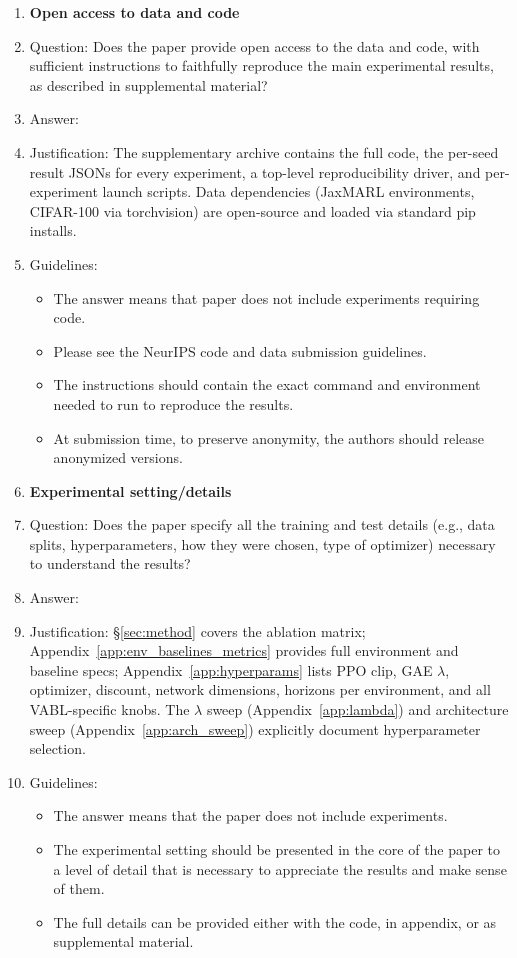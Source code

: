 \begin{enumerate}
\item {\bf Open access to data and code}
    \item[] Question: Does the paper provide open access to the data and code, with sufficient instructions to faithfully reproduce the main experimental results, as described in supplemental material?
    \item[] Answer: \answerYes{}
    \item[] Justification: The supplementary archive contains the full code, the per-seed result JSONs for every experiment, a top-level reproducibility driver, and per-experiment launch scripts. Data dependencies (JaxMARL environments, CIFAR-100 via torchvision) are open-source and loaded via standard pip installs.
    \item[] Guidelines:
    \begin{itemize}
        \item The answer \answerNA{} means that paper does not include experiments requiring code.
        \item Please see the NeurIPS code and data submission guidelines.
        \item The instructions should contain the exact command and environment needed to run to reproduce the results.
        \item At submission time, to preserve anonymity, the authors should release anonymized versions.
    \end{itemize}


\item {\bf Experimental setting/details}
    \item[] Question: Does the paper specify all the training and test details (e.g., data splits, hyperparameters, how they were chosen, type of optimizer) necessary to understand the results?
    \item[] Answer: \answerYes{}
    \item[] Justification: \S\ref{sec:method} covers the ablation matrix; Appendix~\ref{app:env_baselines_metrics} provides full environment and baseline specs; Appendix~\ref{app:hyperparams} lists PPO clip, GAE $\lambda$, optimizer, discount, network dimensions, horizons per environment, and all VABL-specific knobs. The $\lambda$ sweep (Appendix~\ref{app:lambda}) and architecture sweep (Appendix~\ref{app:arch_sweep}) explicitly document hyperparameter selection.
    \item[] Guidelines:
    \begin{itemize}
        \item The answer \answerNA{} means that the paper does not include experiments.
        \item The experimental setting should be presented in the core of the paper to a level of detail that is necessary to appreciate the results and make sense of them.
        \item The full details can be provided either with the code, in appendix, or as supplemental material.
    \end{itemize}


\end{enumerate}
